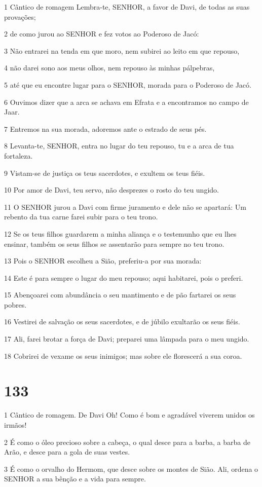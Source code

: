 \par 1 Cântico de romagem Lembra-te, SENHOR, a favor de Davi, de todas as suas provações;
\par 2 de como jurou ao SENHOR e fez votos ao Poderoso de Jacó:
\par 3 Não entrarei na tenda em que moro, nem subirei ao leito em que repouso,
\par 4 não darei sono aos meus olhos, nem repouso às minhas pálpebras,
\par 5 até que eu encontre lugar para o SENHOR, morada para o Poderoso de Jacó.
\par 6 Ouvimos dizer que a arca se achava em Efrata e a encontramos no campo de Jaar.
\par 7 Entremos na sua morada, adoremos ante o estrado de seus pés.
\par 8 Levanta-te, SENHOR, entra no lugar do teu repouso, tu e a arca de tua fortaleza.
\par 9 Vistam-se de justiça os teus sacerdotes, e exultem os teus fiéis.
\par 10 Por amor de Davi, teu servo, não desprezes o rosto do teu ungido.
\par 11 O SENHOR jurou a Davi com firme juramento e dele não se apartará: Um rebento da tua carne farei subir para o teu trono.
\par 12 Se os teus filhos guardarem a minha aliança e o testemunho que eu lhes ensinar, também os seus filhos se assentarão para sempre no teu trono.
\par 13 Pois o SENHOR escolheu a Sião, preferiu-a por sua morada:
\par 14 Este é para sempre o lugar do meu repouso; aqui habitarei, pois o preferi.
\par 15 Abençoarei com abundância o seu mantimento e de pão fartarei os seus pobres.
\par 16 Vestirei de salvação os seus sacerdotes, e de júbilo exultarão os seus fiéis.
\par 17 Ali, farei brotar a força de Davi; preparei uma lâmpada para o meu ungido.
\par 18 Cobrirei de vexame os seus inimigos; mas sobre ele florescerá a sua coroa.

\chapter{133}

\par 1 Cântico de romagem. De Davi Oh! Como é bom e agradável viverem unidos os irmãos!
\par 2 É como o óleo precioso sobre a cabeça, o qual desce para a barba, a barba de Arão, e desce para a gola de suas vestes.
\par 3 É como o orvalho do Hermom, que desce sobre os montes de Sião. Ali, ordena o SENHOR a sua bênção e a vida para sempre.

